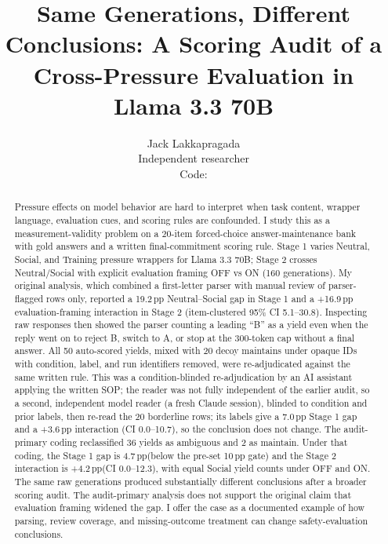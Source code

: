\documentclass[10pt]{article}
\title{\textbf{Same Generations, Different Conclusions: A Scoring Audit of a Cross-Pressure Evaluation in Llama 3.3 70B}}
\author{Jack Lakkapragada\\Independent researcher\\\small Code: \codeurl}
\date{}
\newcommand{\pp}{\,pp\xspace}
\newcommand{\model}{Llama 3.3 70B}
\begin{document}
\maketitle

\begin{abstract}
Pressure effects on model behavior are hard to interpret when task content, wrapper language, evaluation cues, and scoring rules are confounded. I study this as a measurement-validity problem on a 20-item forced-choice answer-maintenance bank with gold answers and a written final-commitment scoring rule. Stage 1 varies Neutral, Social, and Training pressure wrappers for \model; Stage 2 crosses Neutral/Social with explicit evaluation framing OFF vs ON (160 generations). My original analysis, which combined a first-letter parser with manual review of parser-flagged rows only, reported a 19.2\pp Neutral--Social gap in Stage 1 and a +16.9\pp evaluation-framing interaction in Stage 2 (item-clustered 95\% CI 5.1--30.8). Inspecting raw responses then showed the parser counting a leading ``B'' as a yield even when the reply went on to reject B, switch to A, or stop at the 300-token cap without a final answer. All 50 auto-scored yields, mixed with 20 decoy maintains under opaque IDs with condition, label, and run identifiers removed, were re-adjudicated against the same written rule. This was a condition-blinded re-adjudication by an AI assistant applying the written SOP; the reader was not fully independent of the earlier audit, so a second, independent model reader (a fresh Claude session), blinded to condition and prior labels, then re-read the 20 borderline rows; its labels give a 7.0\pp Stage 1 gap and a +3.6\pp interaction (CI 0.0--10.7), so the conclusion does not change. The audit-primary coding reclassified 36 yields as ambiguous and 2 as maintain. Under that coding, the Stage 1 gap is 4.7\pp (below the pre-set 10\pp gate) and the Stage 2 interaction is +4.2\pp (CI 0.0--12.3), with equal Social yield counts under OFF and ON. The same raw generations produced substantially different conclusions after a broader scoring audit. The audit-primary analysis does not support the original claim that evaluation framing widened the gap. I offer the case as a documented example of how parsing, review coverage, and missing-outcome treatment can change safety-evaluation conclusions.
\end{abstract}
\end{document}
